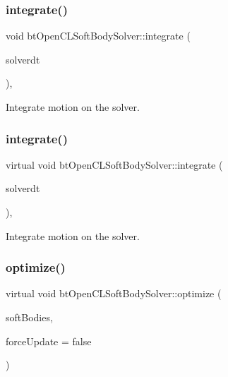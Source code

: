 \subsubsection{\texorpdfstring{integrate()}{integrate()}\hspace{0.1cm}{\footnotesize\ttfamily [1/2]}}
{\footnotesize\ttfamily void bt\+Open\+C\+L\+Soft\+Body\+Solver\+::integrate (\begin{DoxyParamCaption}\item[{float}]{solverdt }\end{DoxyParamCaption})\hspace{0.3cm}{\ttfamily [protected]}, {\ttfamily [virtual]}}

Integrate motion on the solver. \mbox{\label{classbtOpenCLSoftBodySolver_aa2a458178afe9043500b191deb0dce97}} 
\subsubsection{\texorpdfstring{integrate()}{integrate()}\hspace{0.1cm}{\footnotesize\ttfamily [2/2]}}
{\footnotesize\ttfamily virtual void bt\+Open\+C\+L\+Soft\+Body\+Solver\+::integrate (\begin{DoxyParamCaption}\item[{float}]{solverdt }\end{DoxyParamCaption})\hspace{0.3cm}{\ttfamily [protected]}, {\ttfamily [virtual]}}

Integrate motion on the solver. \mbox{\label{classbtOpenCLSoftBodySolver_abfa7d114dc00cb643d73ecb79682cebe}} 
\subsubsection{\texorpdfstring{optimize()}{optimize()}\hspace{0.1cm}{\footnotesize\ttfamily [1/2]}}
{\footnotesize\ttfamily virtual void bt\+Open\+C\+L\+Soft\+Body\+Solver\+::optimize (\begin{DoxyParamCaption}\item[{\hyperlink{classbtAlignedObjectArray}{bt\+Aligned\+Object\+Array}$<$ \hyperlink{classbtSoftBody}{bt\+Soft\+Body} $\ast$ $>$ \&}]{soft\+Bodies,  }\item[{bool}]{force\+Update = {\ttfamily false} }\end{DoxyParamCaption})\hspace{0.3cm}{\ttfamily [virtual]}}

